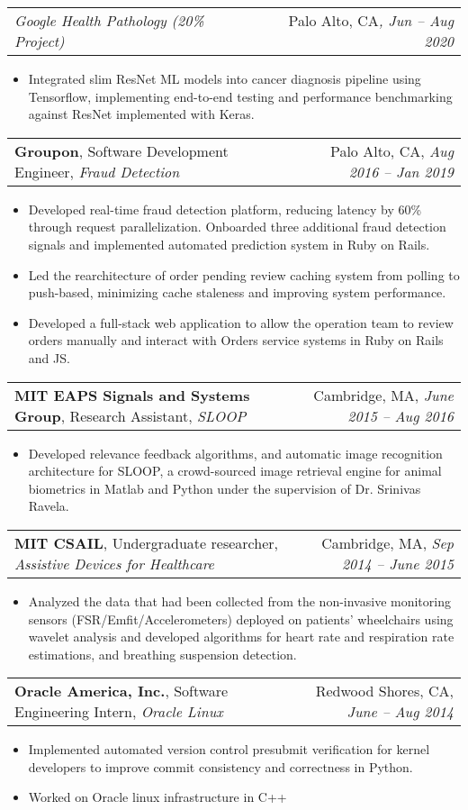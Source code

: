 \documentclass[letterpaper,11pt]{article}
\makeatletter
\newcommand{\resumeItem}[1]{
  \item\small{
    {#1 \vspace{-3pt}}
  }
}
\newcommand{\resumeSubheading}[5]{
  \vspace{-1pt}\item
    \begin{tabular*}{0.97\textwidth}[t]{l@{\extracolsep{\fill}}r}
      \textbf{#1}{\small, #2, \textit{#3}} &  {\small#4}{, \textit{\small #5}} \\
    \end{tabular*}
    \vspace{-9pt}
}
\newcommand{\resumeSubSubheadingMultiteam}[4]{
    \begin{tabular*}{0.97\textwidth}{l@{\extracolsep{\fill}}r}
      \textit{\small#1}{\scriptsize #4} & {\small#2}\textit{\small, #3} \\
    \end{tabular*}
    \vspace{-8pt}
}
\newcommand{\resumeItemListStart}{\begin{itemize}}
\newcommand{\resumeItemListEnd}{\end{itemize}\vspace{-5pt}}
\makeatother
\begin{document}
  \resumeSubSubheadingMultiteam
   {Google Health Pathology (20\% Project)}{Palo Alto, CA}{Jun -- Aug 2020}{}
      \resumeItemListStart
\resumeItem{Integrated slim ResNet ML models into cancer diagnosis pipeline using Tensorflow, implementing end-to-end testing and performance benchmarking against ResNet implemented with Keras.}
      \resumeItemListEnd

    \resumeSubheading
      {Groupon}{Software Development Engineer}{Fraud Detection}
      {Palo Alto, CA}{Aug 2016 -- Jan 2019}
      
      \resumeItemListStart
        \resumeItem{Developed real-time fraud detection platform, reducing latency by 60\% through request parallelization. Onboarded three additional fraud detection signals and implemented automated prediction system in Ruby on Rails.}
        \resumeItem{
        Led the rearchitecture of order pending review caching system from polling to push-based, minimizing cache staleness and improving system performance.}
        \resumeItem{Developed a full-stack web application to allow the operation team to review orders manually and interact with Orders service systems in Ruby on Rails and JS.}
      \resumeItemListEnd

    \resumeSubheading
      {MIT EAPS Signals and Systems Group}{Research Assistant}{SLOOP}
      {Cambridge, MA}{June 2015 -- Aug 2016}
      \resumeItemListStart
        \resumeItem{Developed relevance feedback algorithms, and automatic image recognition architecture for SLOOP, a crowd-sourced image retrieval engine for animal biometrics in Matlab and Python under the supervision of Dr. Srinivas Ravela.}
      \resumeItemListEnd

    \resumeSubheading
      {MIT CSAIL}{Undergraduate researcher}{Assistive Devices for Healthcare}
      {Cambridge, MA}{Sep 2014 -- June 2015}
      \resumeItemListStart
        \resumeItem{Analyzed the data that had been collected from the non-invasive monitoring sensors (FSR/Emfit/Accelerometers) deployed on patients’ wheelchairs using wavelet analysis and developed algorithms for heart rate and respiration rate estimations, and breathing suspension detection.}
      \resumeItemListEnd

    \resumeSubheading
      {Oracle America, Inc.}{Software Engineering Intern}{Oracle Linux}
      {Redwood Shores, CA}{June -- Aug 2014}
      \resumeItemListStart
        \resumeItem{Implemented automated version control presubmit verification for kernel developers to improve commit consistency and correctness in Python.}
        \resumeItem{Worked on Oracle linux infrastructure in C++}
      \resumeItemListEnd
\end{document}
